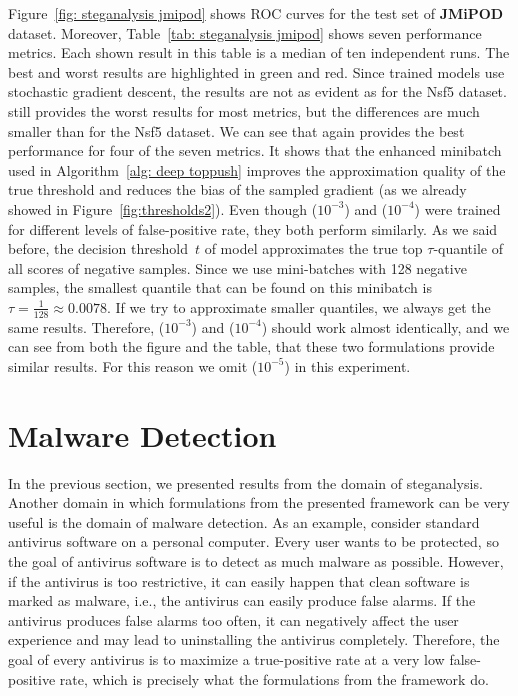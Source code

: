 Figure~\ref{fig: steganalysis jmipod} shows ROC curves for the test set of \textbf{JMiPOD} dataset. Moreover, Table~\ref{tab: steganalysis jmipod} shows seven performance metrics. Each shown result in this table is a median of ten independent runs. The best and worst results are highlighted in green and red. Since trained models use stochastic gradient descent, the results are not as evident as for the Nsf5 dataset. \BaseLine still provides the worst results for most metrics, but the differences are much smaller than for the Nsf5 dataset. We can see that \DeepTopPush again provides the best performance for four of the seven metrics. It shows that the enhanced minibatch used in \DeepTopPush Algorithm~\ref{alg: deep toppush} improves the approximation quality of the true threshold and reduces the bias of the sampled gradient (as we already showed in Figure~\ref{fig:thresholds2}). Even though \PatMatNP($10^{-3}$) and \PatMatNP($10^{-4}$) were trained for different levels of false-positive rate, they both perform similarly. As we said before, the decision threshold~$t$ of \PatMatNP model approximates the true top $\tau$-quantile of all scores of negative samples. Since we use mini-batches with 128 negative samples, the smallest quantile that can be found on this minibatch is~$\tau = \frac{1}{128} \approx 0.0078.$ If we try to approximate smaller quantiles, we always get the same results. Therefore, \PatMatNP($10^{-3}$) and \PatMatNP($10^{-4}$) should work almost identically, and we can see from both the figure and the table, that these two formulations provide similar results. For this reason we omit \PatMatNP($10^{-5}$) in this experiment.

\section{Malware Detection}\label{sec: malware detection}

In the previous section, we presented results from the domain of steganalysis. Another domain in which formulations from the presented framework can be very useful is the domain of malware detection. As an example, consider standard antivirus software on a personal computer. Every user wants to be protected, so the goal of antivirus software is to detect as much malware as possible. However, if the antivirus is too restrictive, it can easily happen that clean software is marked as malware, i.e., the antivirus can easily produce false alarms. If the antivirus produces false alarms too often, it can negatively affect the user experience and may lead to uninstalling the antivirus completely. Therefore, the goal of every antivirus is to maximize a true-positive rate at a very low false-positive rate, which is precisely what the formulations from the framework do.

